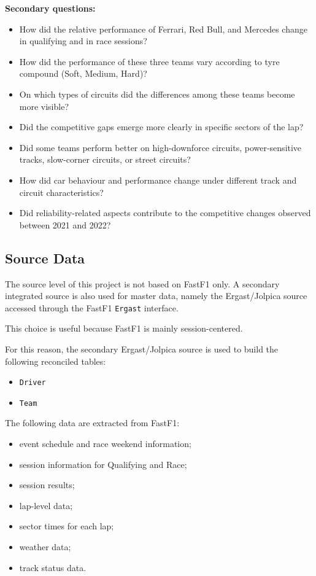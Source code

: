 \documentclass[12pt,a4paper]{article}
\begin{document}
	\vspace{2em}
    \textbf{Secondary questions:}
	\begin{itemize}
		\item How did the relative performance of Ferrari, Red Bull, and Mercedes change in qualifying and in race sessions?
		\item How did the performance of these three teams vary according to tyre compound (Soft, Medium, Hard)?
		\item On which types of circuits did the differences among these teams become more visible?
		\item Did the competitive gaps emerge more clearly in specific sectors of the lap?
		\item Did some teams perform better on high-downforce circuits, power-sensitive tracks, slow-corner circuits, or street circuits?
		\item How did car behaviour and performance change under different track and circuit characteristics?
		\item Did reliability-related aspects contribute to the competitive changes observed between 2021 and 2022?
	\end{itemize}
	
	
	
	\subsection*{Source Data}
	
	The source level of this project is not based on FastF1 only.  
	A secondary integrated source is also used for master data, namely the Ergast/Jolpica source accessed through the FastF1 \texttt{Ergast} interface.
	
	This choice is useful because FastF1 is mainly session-centered.  

	For this reason, the secondary Ergast/Jolpica source is used to build the following reconciled tables:
	\begin{itemize}
		\item \texttt{Driver}
		\item \texttt{Team}
	\end{itemize}
	

	

	The following data are extracted from FastF1:
	\begin{itemize}
		\item event schedule and race weekend information;
		\item session information for Qualifying and Race;
		\item session results;
		\item lap-level data;
		\item sector times for each lap;
		\item weather data;
		\item track status data.
	\end{itemize}
	
\end{document}
